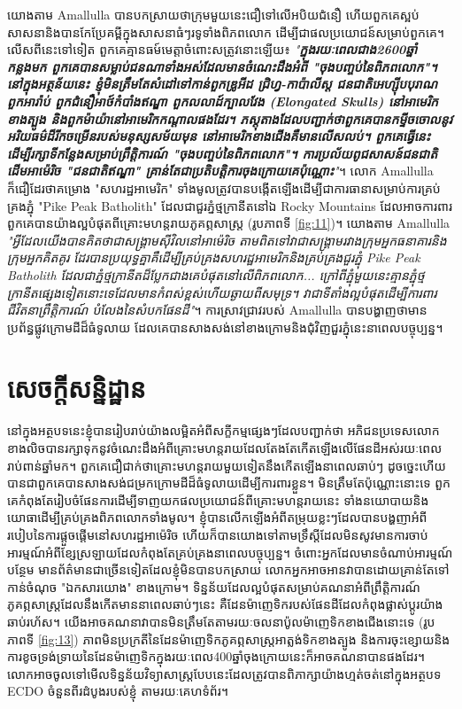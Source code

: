 \documentclass[10pt,twocolumn,letterpaper]{article}
\begin{document}
	យោងតាម Amallulla  បានបកស្រាយថាក្រុមមួយនេះជឿទៅលើអបិយជំនឿ ហើយពួកគេស្អប់សាសនានិងបានកែប្រែគម្ពីក្នុងសាសនាធំៗរទូទាំងពិភពលោក ដើម្បីជាផលប្រយោជន៍សម្រាប់ពួកគេ។ លើសពីនេះទៅទៀត ពួកគេគ្មានធម៍មេត្តាចំពោះសត្រូវនោះឡើយ៖ \textit{"\textbf{ក្នុងរយៈពេលជាង2600ឆ្នាំកន្លងមក ពួកគេបានសម្លាប់ជនណាទាំងអស់ដែលមានចំណេះដឹងអំពី "ចុងបញ្ចប់នៃពិភពលោក"។ នៅក្នុងអត្ថន័យនេះ ខ្ញុំមិនត្រឹមតែសំដៅទៅកាន់ពួកឌ្រូអីដ ជ្រិហ្វ-កាប៉ាលីស្ត ជនជាតិអេហ្ស៊ីបបុរាណ ពួកអារ៉ាប់ ពួកជំនឿអាថ៍កំបាំងឥណ្ឌា ពួកលលាដ៍ក្បាលវែង (Elongated Skulls) នៅអាមេរិកខាងត្បូង និងពួកម៉ាយ៉ានៅអាមេរិកកណ្តាលផងដែរ។ ភស្តុតាងដែលបញ្ជាក់ថាពួកគេបានកម្ទីចចោលនូវអរិយធម៌ដ៏រីកចម្រើនរបស់មនុស្សសម័យមុន នៅអាមេរិកខាងជើងគឺមានលើសលប់។ ពួកគេធ្វើនេះដើម្បីរក្សាទីកន្លែងសម្រាប់ព្រឹត្តិការណ៍ "ចុងបញ្ចប់នៃពិភពលោក"។ ការប្រល័យពូជសាសន៍ជនជាតិដើមអាម៉េរិច "ជនជាតិឥណ្ឌា" គ្រាន់តែជាប្រតិបត្តិការចុងក្រោយគេប៉ុណ្ណោះ}"}\cite{33,34}។
លោក Amallulla ក៏ជឿដែរថាគម្រោង "សហរដ្ឋអាមេរិក" ទាំងមូលត្រូវបានបង្កើតឡើងដើម្បីជាការធានាសម្រាប់ការគ្រប់គ្រងភ្នុំ "Pike Peak Batholith" ដែលជាជួរភ្នំថ្មក្រានីតនៅឯ Rocky Mountains ដែលអាចការពារពួកគេបានយ៉ាងល្អបំផុតពីគ្រោះមហន្តរាយភូគព្ភសាស្ត្រ (រូបភាពទី \ref{fig:11})។ យោងតាម Amallulla \textit{"អ្វីដែលយើងបានគិតថាជាសង្គ្រាមស៊ីវិលនៅអាម៉េរិច តាមពិតទៅវាជាសង្គ្រាមរវាងក្រុមអ្នកធនាគារនិងក្រុមអ្នកគិតគូរ ដែរបានប្រយុទ្ធគ្នាគឺដើម្បីគ្រប់គ្រងសហរដ្ឋអាមេរិកនិងគ្រប់គ្រងជួរភ្នុំ Pike Peak Batholith ដែលជាភ្នំថ្មក្រានីតដ៏ប្លែកជាងគេបំផុតនៅលើពិភពលោក... ក្រៅពីភ្នុំមួយនេះ​ គ្មានភ្នុំថ្មក្រានីតផ្សេងទៀតនោះទេដែលមានកំពស់ខ្ពស់ហើយឆ្ងាយពីសមុទ្រ។  វាជាទីតាំងល្អបំផុតដើម្បីការពារជីវិតនាព្រឹត្តិការណ៍ បំលែងនៃសំបកផែនដី"}\cite{33,34}។ ការស្រាវជ្រាវរបស់ Amallulla បានបង្ហាញថាមានប្រព័ន្ធផ្លូវក្រោមដីដ៏ធំទូលាយ ដែលគេបានសាងសង់នៅខាងក្រោមនិងជុំវិញជួរភ្នុំនេះនាពេលបច្ចុប្បន្ន\cite{36}។

\section{សេចក្តីសន្និដ្ឋាន}

	នៅក្នុងអត្ថបទនេះខ្ញុំបានរៀបរាប់យ៉ាងលម្អិតអំពីសក្ខីកម្មផ្សេងៗដែលបញ្ជាក់ថា អភិជនប្រទេសលោកខាងលិចបានរក្សាទុកនូវចំណេះដឹងអំពីគ្រោះមហន្តរាយដែលតែងតែកើតឡើងលើផែនដីអស់រយៈពេលរាប់ពាន់ឆ្នាំមក។ ពួកគេជឿជាក់ថាគ្រោះមហន្តរាយមួយទៀតនឹងកើតឡើងនាពេលឆាប់ៗ ដូចច្នេះហើយបានជាពួកគេបានសាងសង់ជម្រកក្រោមដីដ៏ធំទូលាយដើម្បីការពារខ្លួន។ មិនត្រឹមតែប៉ុណ្ណោះនោះទេ ពួកគេកំពុងតែរៀបចំផែនការដើម្បីទាញយកផលប្រយោជន៍ពីគ្រោះមហន្តរាយនេះ ទាំងនយោបាយនិងយោធាដើម្បីគ្រប់គ្រងពិភពលោកទាំងមូល។ ខ្ញុំបានលើកឡើងអំពីតម្រុយខ្លះៗដែលបានបង្ហញាអំពីរបៀបនៃការផ្តួចផ្តើមនៅសហរដ្ឋអាម៉េរិច ហើយក៏បានយោងទៅតាមទ្រឹស្តីដែលមិនសូវមានការចាប់អារម្មណ៍អំពីខ្សែស្រឡាយដែលកំពុងតែគ្រប់គ្រងនាពេលបច្ចុប្បន្ន។ ចំពោះអ្នកដែលមានចំណាប់អារម្មណ៍បន្ថែម មានព័ត៌មានជាច្រើនទៀតដែលខ្ញុំមិនបានបកស្រាយ លោកអ្នកអាចអានវាបានដោយគ្រាន់តែទៅកាន់ចំណុច "ឯកសារយោង" ខាងក្រោម។
ទិន្នន័យដែលល្អបំផុតសម្រាប់គណនាអំពីព្រឹត្តិការណ៍ភូគព្ភសាស្ត្រ​ដែលនឹងកើតមាននាពេលឆាប់ៗនេះ គឺដែនម៉ាញេទិករបស់ផែនដីដែលកំពុងផ្លាស់ប្តូរយ៉ាងឆាប់រហ័ស។ យើងអាចគណនាវាបានមិនត្រឹមតែតាមរយៈចលនាប៉ូលម៉ាញេទិកខាងជើងនោះទេ (រូបភាពទី \ref{fig:13}) ភាពមិនប្រក្រតីនៃដែនម៉ាញេទិកភូគព្ភសាស្ត្រអាត្លង់ទិកខាងត្បូង និងការចុះខ្សោយនិងការខូចទ្រង់ទ្រាយនៃដែនម៉ាញេទិកក្នុងរយៈពេល400ឆ្នាំចុងក្រោយនេះក៏អាចគណនាបានផងដែរ\cite{3}។ លោកអាចចូលទៅមើលទិន្នន័យវិទ្យាសាស្ត្របែបនេះដែលត្រូវបានពិភាក្សាយ៉ាងហ្មត់ចត់នៅក្នុងអត្ថបទ ECDO ចំនួនពីរដំបូងរបស់ខ្ញុំ តាមរយៈគេហទំព័រ\cite{3}។
\end{document}
